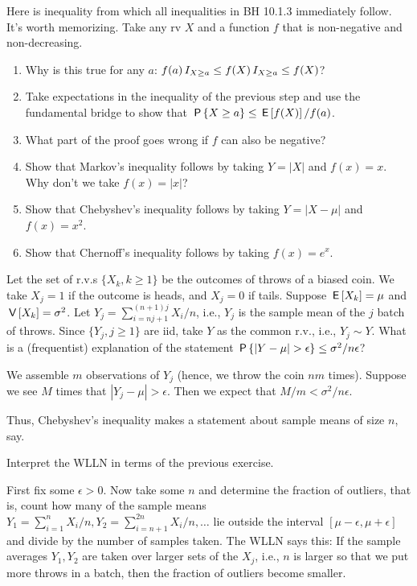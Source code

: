 \begin{exercise}
Here is inequality from which all inequalities in BH 10.1.3 immediately follow. It's worth memorizing.
Take any rv $X$ and a function $f$ that is non-negative and non-decreasing.
\begin{enumerate}
\item Why is this true for any $a$: $f(a) \,I_{X\geq a} \leq f(X) \,I_{X\geq a} \leq f(X)$?
\item Take expectations in the inequality of the previous step and use the fundamental bridge to show that $\,\mathsf{P}\left\{X\geq a\right\} \leq \,\mathsf{E}\left[f(X)\right]/f(a)$.
\item What part of the proof goes wrong if  $f$ can also be negative?
\item Show that Markov's inequality follows by taking $Y=|X|$ and  $f(x)=x$. Why don't we take $f(x) = |x|$?
\item Show that Chebyshev's inequality follows by taking $Y=|X-\mu|$ and $f(x)=x^2$.
\item Show that Chernoff's inequality follows by taking $f(x)=e^{x}$.
\end{enumerate}
\end{exercise}

\begin{exercise}\label{ex:13-1}
Let the set of r.v.s $\{X_{k}, k\geq 1\}$ be the outcomes of throws of a biased coin. We take $X_{j}=1$ if the outcome is heads, and $X_{j}=0$ if tails. Suppose $\,\mathsf{E}\left[X_{k}\right] = \mu$ and $\,\mathsf{V}\left[X_{k}\right] = \sigma^{2}$.
Let $Y_{j} = \sum_{i=n j + 1}^{(n+1)j} X_{i}/n$, i.e., $Y_{j}$ is the sample mean of the $j$ batch of throws. Since $\{Y_{j}, j\geq 1\}$ are iid, take $Y$ as the common r.v., i.e., $Y_{j} \sim Y$.
What is a (frequentist) explanation of the statement $\P{|Y-\mu|>\epsilon} \leq \sigma^{2}/n \epsilon$?
\begin{solution}
  We assemble $m$ observations of $Y_{j}$ (hence, we throw the coin $n m$ times).
  Suppose we see $M$ times that $|Y_{j} - \mu|> \epsilon$. Then we expect that $M/m < \sigma^{2}/n\epsilon$.

Thus,  Chebyshev's inequality makes a statement about sample means of size $n$, say.
\end{solution}
\end{exercise}

\begin{exercise}
Interpret the WLLN in terms of the previous exercise.
\begin{solution}
  First fix some $\epsilon>0$.
  Now take some $n$ and determine the fraction of outliers, that is, count how many of the sample means $Y_{1}=\sum_{i=1}^{n} X_{i}/n, Y_{2}=\sum_{i=n+1}^{2n} X_{i}/n, \ldots$ lie outside the interval $[\mu-\epsilon, \mu + \epsilon]$ and divide by the number of samples taken.
  The WLLN says this: If the sample averages $Y_{1}, Y_{2}$ are taken over larger sets of the $X_{j}$, i.e., $n$ is larger so that we put more throws in a batch, then the fraction of outliers become smaller.
\end{solution}
\end{exercise}



